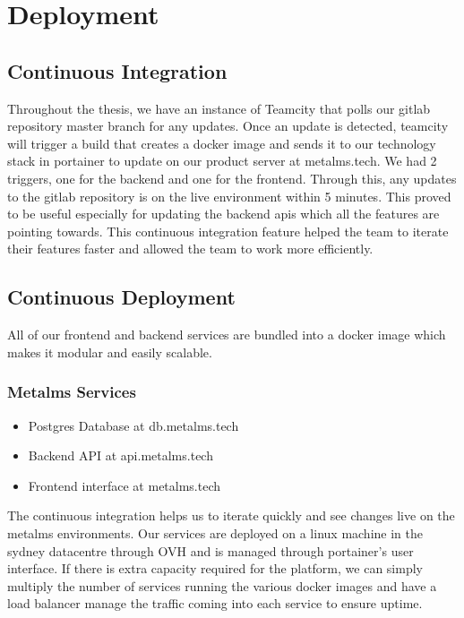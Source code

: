 \section{Deployment}
\subsection{Continuous Integration}
Throughout the thesis, we have an instance of Teamcity that polls our gitlab repository master branch for any updates. Once an update is detected, teamcity will trigger a build that creates a docker image and sends it to our technology stack in portainer to update on our product server at metalms.tech. We had 2 triggers, one for the backend and one for the frontend. Through this, any updates to the gitlab repository is on the live environment within 5 minutes. This proved to be useful especially for updating the backend apis which all the features are pointing towards. This continuous integration feature helped the team to iterate their features faster and allowed the team to work more efficiently.

\subsection{Continuous Deployment}
All of our frontend and backend services are bundled into a docker image which makes it modular and easily scalable.

\subsubsection{Metalms Services}
\begin{itemize}
  \item Postgres Database at db.metalms.tech
  \item Backend API at api.metalms.tech
  \item Frontend interface at metalms.tech
\end{itemize}

The continuous integration helps us to iterate quickly and see changes live on the metalms environments. Our services are deployed on a linux machine in the sydney datacentre through OVH and is managed through portainer's user interface. If there is extra capacity required for the platform, we can simply multiply the number of services running the various docker images and have a load balancer manage the traffic coming into each service to ensure uptime.